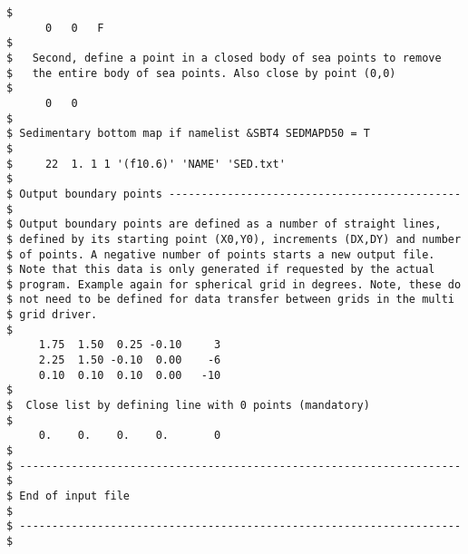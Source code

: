 \begin{footnotesize}
\begin{verbatim}
$
      0   0   F
$
$   Second, define a point in a closed body of sea points to remove
$   the entire body of sea points. Also close by point (0,0)
$
      0   0
$
$ Sedimentary bottom map if namelist &SBT4 SEDMAPD50 = T
$
$     22  1. 1 1 '(f10.6)' 'NAME' 'SED.txt'
$
$ Output boundary points --------------------------------------------- $
$ Output boundary points are defined as a number of straight lines,
$ defined by its starting point (X0,Y0), increments (DX,DY) and number
$ of points. A negative number of points starts a new output file.
$ Note that this data is only generated if requested by the actual
$ program. Example again for spherical grid in degrees. Note, these do
$ not need to be defined for data transfer between grids in the multi
$ grid driver.
$
     1.75  1.50  0.25 -0.10     3
     2.25  1.50 -0.10  0.00    -6
     0.10  0.10  0.10  0.00   -10
$
$  Close list by defining line with 0 points (mandatory)
$
     0.    0.    0.    0.       0
$
$ -------------------------------------------------------------------- $
$ End of input file                                                    $
$ -------------------------------------------------------------------- $
\end{verbatim}
\end{footnotesize}

